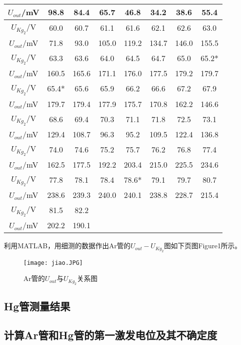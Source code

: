 \documentclass[a4paper,11pt]{article}
\begin{document}
\begin{CJK*}{UTF8}{gbsn}
\begin{longtable}{|c|c|c|c|c|c|c|c|}
\hline		
$U_{out}$/mV & 98.8 & 84.4 & 65.7 & 46.8 & 34.2 & 38.6 & 55.4 \\
\hline\hline	
$U_{Kg_2}$/V & 60.0 & 60.7 & 61.1 & 61.6 & 62.1 & 62.6 & 63.0 \\
\hline		
$U_{out}$/mV & 71.8 & 93.0 & 105.0 & 119.2 & 134.7 & 146.0 & 155.5 \\
\hline\hline	
$U_{Kg_2}$/V & 63.3 & 63.6 & 64.0 & 64.5 & 64.7 & 65.0 & 65.2* \\
\hline		
$U_{out}$/mV & 160.5 & 165.6 & 171.1 & 176.0 & 177.5 & 179.2 & 179.7 \\
\hline\hline	
$U_{Kg_2}$/V & 65.4* & 65.6 & 65.9 & 66.2 & 66.6 & 67.2 & 67.9 \\
\hline		
$U_{out}$/mV & 179.7 & 179.4 & 177.9 & 175.7 & 170.8 & 162.2 & 146.6 \\
\hline\hline	
$U_{Kg_2}$/V & 68.6 & 69.4 & 70.3 & 71.1 & 71.8 & 72.5 & 73.1 \\
\hline		
$U_{out}$/mV & 129.4 & 108.7 & 96.3 & 95.2 & 109.5 & 122.4 & 136.8 \\
\hline\hline	
$U_{Kg_2}$/V & 74.0 & 74.6 & 75.2 & 75.7 & 76.2 & 76.8 & 77.4 \\
\hline		
$U_{out}$/mV & 162.5 & 177.5 & 192.2 & 203.4 & 215.0 & 225.5 & 234.6 \\
\hline\hline	
$U_{Kg_2}$/V & 77.8 & 78.1 & 78.4 & 78.6* & 79.1 & 79.7 & 80.7 \\
\hline		
$U_{out}$/mV & 238.6 & 239.3 & 240.0 & 240.1 & 238.8 & 228.7 & 215.4 \\
\hline\hline	
$U_{Kg_2}$/V & 81.5 & 82.2 &&&&& \\
\hline		
$U_{out}$/mV & 202.2 & 190.1 &&&&& \\
\hline
\end{longtable}
\par
利用MATLAB，用细测的数据作出Ar管的$U_{out} - U_{Kg_2}$图如下页图Figure\:1所示。
\begin{figure}[htbp]
\centering
\caption{Ar管的$U_{out}$与$U_{Kg_2}$关系图}
\texttt{[image: jiao.JPG]} 
\end{figure}

\subsection{Hg管测量结果}

\subsection{计算Ar管和Hg管的第一激发电位及其不确定度}


\end{CJK*}
\end{document}
